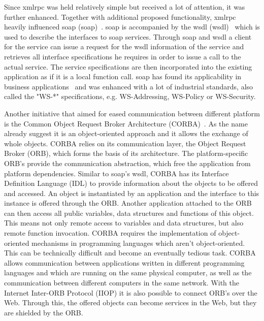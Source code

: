 Since \textrm{\acrshort{xmlrpc}} was held relatively simple but received a lot of attention, it was further enhanced.
Together with additional proposed functionality, \textrm{\acrshort{xmlrpc}} heavily influenced \textrm{\acrlong{soap}} (\textrm{\acrshort{soap}})~\cite{box2000simple}.
\textrm{\acrshort{soap}} is accompanied by the \acrlong{wsdl} (\textrm{\acrshort{wsdl}})~\cite{christensen2001web} which is used to describe the interfaces to \acrshort{soap} services.
Through \textrm{\acrshort{soap}} and \textrm{\acrshort{wsdl}} a client for the service can issue a request for the \textrm{\acrshort{wsdl}} information of the service and retrieves all interface specifications he requires in order to issue a call to the actual service.
The service specifications are then incorporated into the existing application as if it is a local function call.
\textrm{\acrshort{soap}} has found its applicability in business applications~\cite{journals/itpro/BarrosD06} and was enhanced with a lot of industrial standards, also called the "WS-*" specifications, e.g. WS-Addressing, WS-Policy or WS-Security.

Another initiative that aimed for eased communication between different platform is the Common Object Request Broker Architecture (\textrm{CORBA})~\cite{dec1991common}.
As the name already suggest it is an object-oriented approach and it allows the exchange of whole objects.
\textrm{CORBA} relies on its communication layer, the Object Request Broker (\textrm{ORB}), which forms the basis of its architecture.
The platform-specific \textrm{ORB}'s provide the communication abstraction, which free the application from platform dependencies.
Similar to \textrm{\acrshort{soap}}'s \textrm{\acrshort{wsdl}}, \textrm{CORBA} has its Interface Definition Language (\textrm{IDL}) to provide information about the objects to be offered and accessed.
An object is instantiated by an application and the interface to this instance is offered through the \textrm{ORB}.
Another application attached to the \textrm{ORB} can then access all public variables, data structures and functions of this object.
This means not only remote access to variables and data structures, but also remote function invocation.
\textrm{CORBA} requires the implementation of object-oriented mechanisms in programming languages which aren't object-oriented.
This can be technically difficult and become an eventually tedious task.
\textrm{CORBA} allows communication between applications written in different programming languages and which are running on the same physical computer, as well as the communication between different computers in the same network.
With the Internet Inter-\textrm{ORB} Protocol (\textrm{IIOP}) it is also possible to connect \textrm{ORB}'s over the Web.
Through this, the offered objects can become services in the Web, but they are shielded by the \textrm{ORB}.


